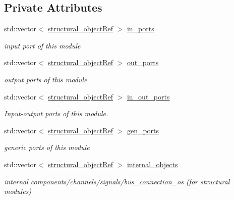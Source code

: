 \subsection*{Private Attributes}
\begin{DoxyCompactItemize}
\item 
std\+::vector$<$ \hyperlink{structural__objects_8hpp_a8ea5f8cc50ab8f4c31e2751074ff60b2}{structural\+\_\+object\+Ref} $>$ \hyperlink{classmodule_a6bc6140e8f911a97b35fc5ffa412c96f}{in\+\_\+ports}
\begin{DoxyCompactList}\small\item\em input port of this module \end{DoxyCompactList}\item 
std\+::vector$<$ \hyperlink{structural__objects_8hpp_a8ea5f8cc50ab8f4c31e2751074ff60b2}{structural\+\_\+object\+Ref} $>$ \hyperlink{classmodule_a772cf68eccb72960057992f44c1fe311}{out\+\_\+ports}
\begin{DoxyCompactList}\small\item\em output ports of this module \end{DoxyCompactList}\item 
std\+::vector$<$ \hyperlink{structural__objects_8hpp_a8ea5f8cc50ab8f4c31e2751074ff60b2}{structural\+\_\+object\+Ref} $>$ \hyperlink{classmodule_a7ce36ee0a25a7d1b7ab120051baf7858}{in\+\_\+out\+\_\+ports}
\begin{DoxyCompactList}\small\item\em Input-\/output ports of this module. \end{DoxyCompactList}\item 
std\+::vector$<$ \hyperlink{structural__objects_8hpp_a8ea5f8cc50ab8f4c31e2751074ff60b2}{structural\+\_\+object\+Ref} $>$ \hyperlink{classmodule_adcd579200b0fcf4ed6f583700b86aad8}{gen\+\_\+ports}
\begin{DoxyCompactList}\small\item\em generic ports of this module \end{DoxyCompactList}\item 
std\+::vector$<$ \hyperlink{structural__objects_8hpp_a8ea5f8cc50ab8f4c31e2751074ff60b2}{structural\+\_\+object\+Ref} $>$ \hyperlink{classmodule_af6bb82c274a7f59e1238a5b5eb549898}{internal\+\_\+objects}
\begin{DoxyCompactList}\small\item\em internal components/channels/signals/bus\+\_\+connection\+\_\+os (for structural modules) \end{DoxyCompactList}\item 

\end{DoxyCompactItemize}
